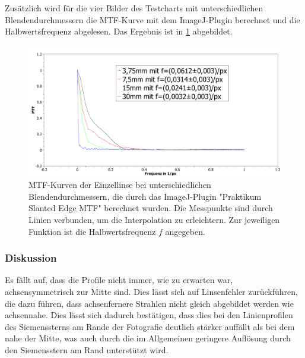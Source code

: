 \documentclass[
	a4paper,
	12pt,
	pagesize,
	ngerman
]{scrartcl}
\begin{document}
	Zusätzlich wird für die vier Bilder des Testcharts mit unterschiedlichen Blendendurchmessern die MTF-Kurve  mit dem ImageJ-Plugin berechnet und die Halbwertsfrequenz abgelesen.
	Das Ergebnis ist in \cref{fig_einzel_mtf} abgebildet.
	
	\begin{figure}[H]  
		\includegraphics[width=1\textwidth]{fig_Einzellinse_MTF}
		\centering
		\caption{
			MTF-Kurven der Einzellinse bei unterschiedlichen Blendendurchmessern, die durch das ImageJ-Plugin "Praktikum Slanted Edge MTF" berechnet wurden.
			Die Messpunkte sind durch Linien verbunden, um die Interpolation zu erleichtern.%
			Zur jeweiligen Funktion ist die Halbwertsfrequenz $f$ angegeben.
		}
		\label{fig_einzel_mtf}
		\centering
	\end{figure}
	

	\subsubsection{Diskussion}
	
	Es fällt auf, dass die Profile nicht immer, wie zu erwarten war, achsensymmetrisch zur Mitte sind.
	Dies lässt sich auf Linsenfehler zurückführen, die dazu führen, dass achsenfernere Strahlen nicht gleich abgebildet werden wie achsennahe.
	Dies lässt sich dadurch bestätigen, dass dies bei den Linienprofilen des Siemenssterns am Rande der Fotografie deutlich stärker auffällt als bei dem nahe der Mitte, was auch durch die im Allgemeinen geringere Auflösung durch den Siemensstern am Rand unterstützt wird.
	
\end{document}
